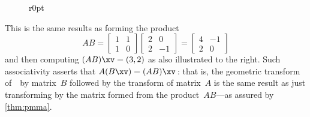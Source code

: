 \begin{example}
\begin{figure}r{0pt}
\end{figure}
This is the same results as forming the product
\begin{equation*}
AB=\begin{bmatrix} 1&1\\1&0 \end{bmatrix} 
\begin{bmatrix} 2&0\\2&-1 \end{bmatrix}
=\begin{bmatrix} 4&-1\\2&0 \end{bmatrix}
\end{equation*}
and then computing \((AB)\xv=(3,2)\) as also illustrated to the right.
Such associativity asserts that \(A(B\xv)=(AB)\xv\)\,: that is, the geometric transform of~\xv\ by matrix~\(B\) followed by the transform of matrix~\(A\) is the same result as just transforming by the matrix formed from the product~\(AB\)---as assured by \cref{thm:pmma}.
\end{example}



